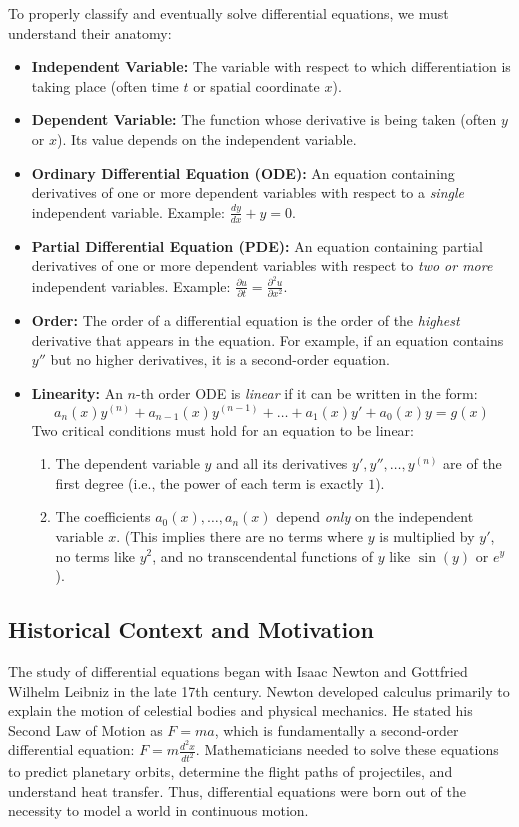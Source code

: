 \documentclass[11pt]{article}
\begin{document}
To properly classify and eventually solve differential equations, we must understand their anatomy:
\begin{itemize}
    \item \textbf{Independent Variable:} The variable with respect to which differentiation is taking place (often time $t$ or spatial coordinate $x$).
    \item \textbf{Dependent Variable:} The function whose derivative is being taken (often $y$ or $x$). Its value depends on the independent variable.
    \item \textbf{Ordinary Differential Equation (ODE):} An equation containing derivatives of one or more dependent variables with respect to a \textit{single} independent variable. Example: $\frac{dy}{dx} + y = 0$.
    \item \textbf{Partial Differential Equation (PDE):} An equation containing partial derivatives of one or more dependent variables with respect to \textit{two or more} independent variables. Example: $\frac{\partial u}{\partial t} = \frac{\partial^2 u}{\partial x^2}$.
    \item \textbf{Order:} The order of a differential equation is the order of the \textit{highest} derivative that appears in the equation. For example, if an equation contains $y''$ but no higher derivatives, it is a second-order equation.
    \item \textbf{Linearity:} An $n$-th order ODE is \textit{linear} if it can be written in the form:
    \[ a_n(x)y^{(n)} + a_{n-1}(x)y^{(n-1)} + \dots + a_1(x)y' + a_0(x)y = g(x) \]
    Two critical conditions must hold for an equation to be linear:
    \begin{enumerate}
        \item The dependent variable $y$ and all its derivatives $y', y'', \dots, y^{(n)}$ are of the first degree (i.e., the power of each term is exactly $1$).
        \item The coefficients $a_0(x), \dots, a_n(x)$ depend \textit{only} on the independent variable $x$. (This implies there are no terms where $y$ is multiplied by $y'$, no terms like $y^2$, and no transcendental functions of $y$ like $\sin(y)$ or $e^y$).
    \end{enumerate}
\end{itemize}

\subsection{Historical Context and Motivation}
The study of differential equations began with Isaac Newton and Gottfried Wilhelm Leibniz in the late 17th century. Newton developed calculus primarily to explain the motion of celestial bodies and physical mechanics. He stated his Second Law of Motion as $F = ma$, which is fundamentally a second-order differential equation: $F = m \frac{d^2x}{dt^2}$. Mathematicians needed to solve these equations to predict planetary orbits, determine the flight paths of projectiles, and understand heat transfer. Thus, differential equations were born out of the necessity to model a world in continuous motion.
\end{document}
